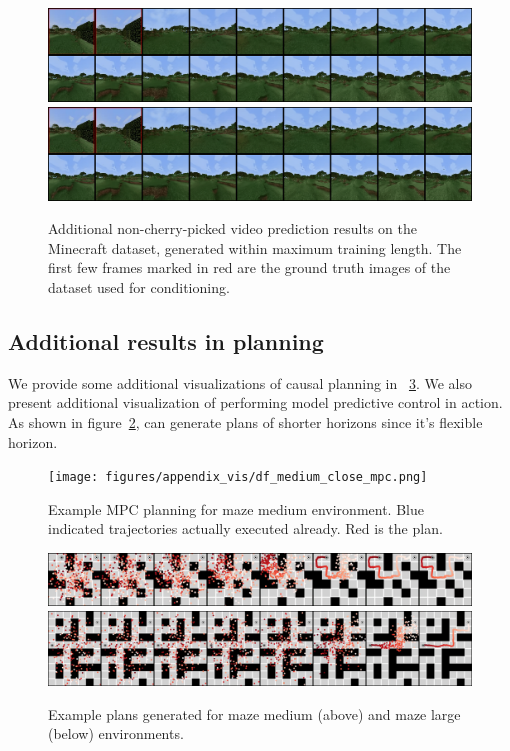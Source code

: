 \begin{figure}[h]
    \centering
    \includegraphics[width=\textwidth]{figures/appendix_vis/minecraft_df_0.png}
    \includegraphics[width=\textwidth]{figures/appendix_vis/minecraft_df_0.png}
    \caption{Additional non-cherry-picked video prediction results on the Minecraft dataset, generated within maximum training length. The first few frames marked in red are the ground truth images of the dataset used for conditioning.}
    \label{fig:minecraft_short}
\end{figure}


\newpage

\subsection{Additional results in planning}
We provide some additional visualizations of causal planning in ~\ref{fig:df_plans_additional}. We also present additional visualization of \algo{} performing model predictive control in action. As shown in figure~\ref{fig:mpc_medium_0}, \algo{} can generate plans of shorter horizons since it's flexible horizon.
\begin{figure}[t]
    \centering
    \texttt{[image: figures/appendix\_vis/df\_medium\_close\_mpc.png]}
    \caption{Example MPC planning for maze medium environment. Blue indicated trajectories actually executed already. Red is the plan.}
    \label{fig:mpc_medium_0}
\end{figure}

\begin{figure}[t]
    \centering
    \includegraphics[width=\textwidth]{figures/appendix_vis/df_medium_close.png}
    \includegraphics[width=\textwidth]{figures/appendix_vis/df_large_close.png}
    \caption{Example plans generated for maze medium (above) and maze large (below) environments.}
    \label{fig:df_plans_additional}
\end{figure}
\newpage

